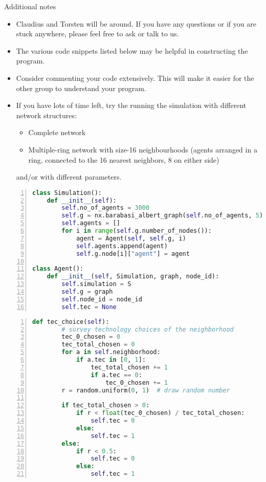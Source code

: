 \documentclass[25pt,a4paper]{article}
\begin{document}
$$$$
Additional notes
\begin{itemize}
  \item Claudius and Torsten will be around. If you have any questions or if you are stuck anywhere, please feel free to ask or talk to us.
  \item The various code snippets listed below may be helpful in constructing the program.
  \item Consider commenting your code extensively. This will make it easier for the other group to understand your program.
  \item If you have lots of time left, try the running the simulation with different network structures:
  \begin{itemize}
    \item Complete network
    \item Multiple-ring network with size-16 neighbourhoods (agents arranged in a ring, connected to the 16 nearest neighbors, 8 on either side)
  \end{itemize}
        and/or with different parameters.
\end{itemize}

\small

\begin{lstlisting}[language=Python,frame=single,numbers=left,title=Script: Possible constructor methods of Simulation class and Agent class]
class Simulation():
    def __init__(self):
        self.no_of_agents = 3000
        self.g = nx.barabasi_albert_graph(self.no_of_agents, 5)
        self.agents = []
        for i in range(self.g.number_of_nodes()):
            agent = Agent(self, self.g, i)
            self.agents.append(agent)
            self.g.node[i]["agent"] = agent

class Agent():
    def __init__(self, Simulation, graph, node_id):
        self.simulation = S
        self.g = graph
        self.node_id = node_id  
        self.tec = None
\end{lstlisting}
\normalsize


\begin{lstlisting}[language=Python,frame=single,numbers=left,title=Script: A possible method for the agent class to choose a technology]
    def tec_choice(self):
        # survey technology choices of the neighborhood
        tec_0_chosen = 0
        tec_total_chosen = 0
        for a in self.neighborhood:
            if a.tec in [0, 1]:
                tec_total_chosen += 1
                if a.tec == 0:
                    tec_0_chosen += 1
        r = random.uniform(0, 1)  # draw random number
        
        if tec_total_chosen > 0:  
            if r < float(tec_0_chosen) / tec_total_chosen:
                self.tec = 0
            else:
                self.tec = 1
        else:
            if r < 0.5:
                self.tec = 0
            else:
                self.tec = 1
\end{lstlisting}
\normalsize
\end{document}
